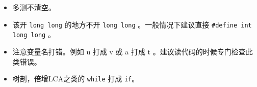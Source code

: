 \begin{itemize}
    \item 多测不清空。
    \item 该开 \verb|long long| 的地方不开 \verb|long long| 。一般情况下建议直接 \verb|#define int long long| 。
    \item 注意变量名打错。例如 u 打成 v 或 a 打成 t 。建议读代码的时候专门检查此类错误。
    \item 树剖，倍增LCA之类的 \verb|while| 打成 \verb|if|。
\end{itemize}